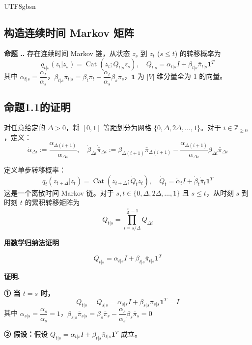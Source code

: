 \documentclass[11pt,a4paper]{article}
\newcounter{proposition}[section]
\renewcommand{\theproposition}{\thesection.\arabic{proposition}}
\DeclareMathOperator{\Cat}{Cat}
\begin{document}
\begin{CJK}{UTF8}{gbsn}
\subsection{构造连续时间 Markov 矩阵}

\begin{propbox}
\textbf{命题 \theproposition.}
存在连续时间 Markov 链，从状态 $z_s$ 到 $z_t$ ($s \leq t$)  的转移概率为
\[
q_{t|s}(z_t|z_s) = \Cat(z_t; Q_{t|s} z_s), \quad Q_{t|s} = \alpha_{t|s} I + \beta_{t|s} \bar{\pi}_{t|s} \mathbf{1}^T
\]
其中 $\alpha_{t|s} = \dfrac{\alpha_t}{\alpha_s}$，$\beta_{t|s} \bar{\pi}_{t|s} = \beta_t \bar{\pi}_t - \dfrac{\alpha_t}{\alpha_s} \beta_s \bar{\pi}_s$，$\mathbf{1}$ 为 $|V|$ 维分量全为 1 的向量。
\end{propbox}

\subsection{命题1.1的证明}

对任意给定的 $\Delta > 0$，将 $[0,1]$ 等距划分为网格 $\{0, \Delta, 2\Delta, \ldots, 1\}$。对于 $i \in \mathbb{Z}_{\geq 0}$，定义：
\[
\dot{\alpha}_{\Delta i} := \frac{\alpha_{\Delta(i+1)}}{\alpha_{\Delta i}}, \quad
\dot{\beta}_{\Delta i} \dot{\bar{\pi}}_{\Delta i} := \beta_{\Delta(i+1)} \bar{\pi}_{\Delta(i+1)} - \frac{\alpha_{\Delta(i+1)}}{\alpha_{\Delta i}} \beta_{\Delta i} \bar{\pi}_{\Delta i}
\]

定义单步转移概率：
\[
q_t(z_{t+\Delta}|z_t) = \Cat(z_{t+\Delta}; \dot{Q}_t z_t), \quad \dot{Q}_t = \dot{\alpha}_t I + \dot{\beta}_t \dot{\bar{\pi}}_t \mathbf{1}^T
\]
这是一个离散时间 Markov 链。对于 $s, t \in \{0, \Delta, 2\Delta, \ldots, 1\}$ 且 $s \leq t$，从时刻 $s$ 到时刻 $t$ 的累积转移矩阵为
\[
Q_{t|s} = \prod_{i=s/\Delta}^{\frac{t}{\Delta}-1} \dot{Q}_{\Delta i}
\]

\textbf{用数学归纳法证明}

\[
Q_{t|s} = \alpha_{t|s} I + \beta_{t|s} \bar{\pi}_{t|s} \mathbf{1}^T
\]

\textbf{证明.}

\textbf{① 当 $t=s$ 时，}
\[
Q_{t|s} = Q_{s|s} = \alpha_{s|s} I + \beta_{s|s} \bar{\pi}_{s|s} \mathbf{1}^T = I
\]
其中 $\alpha_{s|s} = \dfrac{\alpha_s}{\alpha_s} = 1$，$\beta_{s|s} \bar{\pi}_{s|s} = \beta_s \bar{\pi}_s - \dfrac{\alpha_s}{\alpha_s} \beta_s \bar{\pi}_s = 0$

\textbf{② 假设：}假设 $Q_{t|s} = \alpha_{t|s} I + \beta_{t|s} \bar{\pi}_{t|s} \mathbf{1}^T$ 成立。


\end{CJK}
\end{document}
